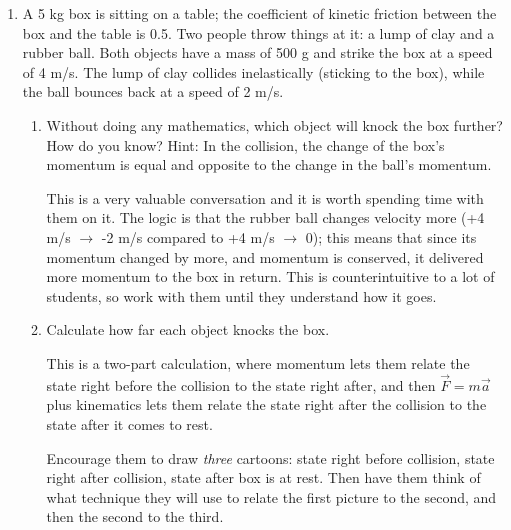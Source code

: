 \documentclass[12pt]{article}
\begin{document}
\begin{enumerate}
\begin{enumerate}
			
		\end{enumerate}
		
		\newpage
		
		
		\item{A 5 kg box is sitting on a table; the coefficient of kinetic friction between the box and the table is 0.5.
			Two people throw things at it: a lump of clay and a rubber ball. Both objects have a mass of 500 g and strike the box at a speed of 4 m/s. The lump of clay collides inelastically (sticking to the box), while the ball bounces back at a speed of 2 m/s.}
		\begin{enumerate}
			\item{Without doing any mathematics, which object will knock the box further? How do you know? Hint: In the collision, the change of the box's momentum is equal and opposite to the change in the ball's momentum.}
			
{			\color{red} This is a very valuable conversation and it is worth spending time with them on it. The logic is that the rubber ball changes velocity more (+4 m/s $\rightarrow$ -2 m/s compared to +4 m/s $\rightarrow$ 0); this means that since its momentum changed by more, and momentum is conserved, it delivered more momentum to the box in return. This is counterintuitive to a lot of students, so work with them 
	until they understand how it goes.}
	

			
			\vspace{2in}
			\item{Calculate how far each object knocks the box.}
			
			{\color{red} This is a two-part calculation, where momentum lets them relate the state right before the collision to the state right after, and then $\vec F = m \vec a$ plus kinematics lets them relate the state right after the collision to the state after it comes to rest.
				
				Encourage them to draw {\it three} cartoons: state right before collision, state right after collision, state after box is at rest. Then have them think of what technique they will use to relate the first picture to the second, and then the second to the third.}
			
		\end{enumerate}
	\end{enumerate}
	
\end{document}
